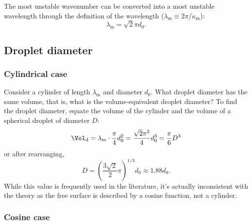 \documentclass[ccbysa,note,git]{bmtreport}
\begin{document}
The most unstable wavenumber can be converted into a most unstable wavelength through the definition of the wavelength ($\lambda_\text{m} \equiv 2 \pi / \kappa_\text{m}$):
\begin{equation}
   \lambda_\text{m} = \sqrt{2} \pi d_0. \label{eq:most unstable wavelength}
\end{equation}

\subsection{Droplet diameter}

\subsubsection{Cylindrical case}

Consider a cylinder of length $\lambda_\text{m}$ and diameter $d_0$. What droplet diameter has the same volume, that is, what is the volume-equivalent droplet diameter? To find the droplet diameter, equate the volume of the cylinder and the volume of a spherical droplet of diameter $D$:
\begin{equation}
   \Vol_\text{d} = \lambda_\text{m} \cdot \frac{\pi}{4} d_0^2 = \frac{\sqrt{2} \pi^2}{4} d_0^3 = \frac{\pi}{6} D^3
\end{equation}
or after rearranging,
\begin{equation}
   D = \left(\frac{3 \sqrt{2}}{2} \pi\right)^{1/3} d_0 \approx 1.88 d_0.
\end{equation}
While this value is frequently used in the literature, it's actually inconsistent with the theory as the free surface is described by a cosine function, not a cylinder.

\subsubsection{Cosine case}
\end{document}
